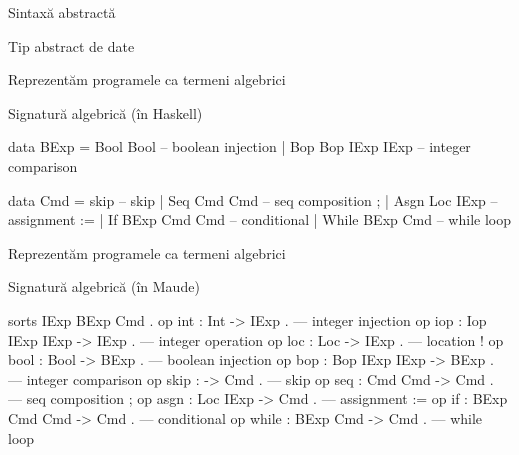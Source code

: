 \documentclass[xcolor=pdftex,romanian,colorlinks]{beamer}
\begin{document}
\begin{section}{Sintaxă abstractă}
\begin{subsection}{Tip abstract de date}
\begin{frame}[fragile]{}{Reprezentăm programele ca termeni algebrici}
\begin{block}{Signatură algebrică (în Haskell)}
\begin{asciihs}
  data BExp = Bool Bool                -- boolean injection
            | Bop Bop IExp IExp        -- integer comparison 

  data Cmd  = skip                     -- skip
            | Seq Cmd Cmd              -- seq composition ;
            | Asgn Loc IExp            -- assignment :=
            | If BExp Cmd Cmd          -- conditional
            | While BExp Cmd           -- while loop
\end{asciihs}
\end{block} 
\end{frame}

\begin{frame}[fragile]{}{Reprezentăm programele ca termeni algebrici}
\begin{block}{Signatură algebrică (în Maude)}
\begin{asciik}
  sorts IExp BExp Cmd . 
  op int : Int -> IExp .               --- integer injection
  op iop : Iop IExp IExp -> IExp .     --- integer operation 
  op loc : Loc -> IExp .               --- location !
  op bool : Bool -> BExp .             --- boolean injection
  op bop : Bop IExp IExp -> BExp .     --- integer comparison 
  op skip : -> Cmd .                   --- skip
  op seq : Cmd Cmd -> Cmd .            --- seq composition ;
  op asgn : Loc IExp -> Cmd .          --- assignment :=
  op if : BExp Cmd Cmd -> Cmd .        --- conditional
  op while : BExp Cmd -> Cmd .         --- while loop
\end{asciik}
\end{block}
\end{frame}


\end{subsection}
\end{section}
\end{document}
